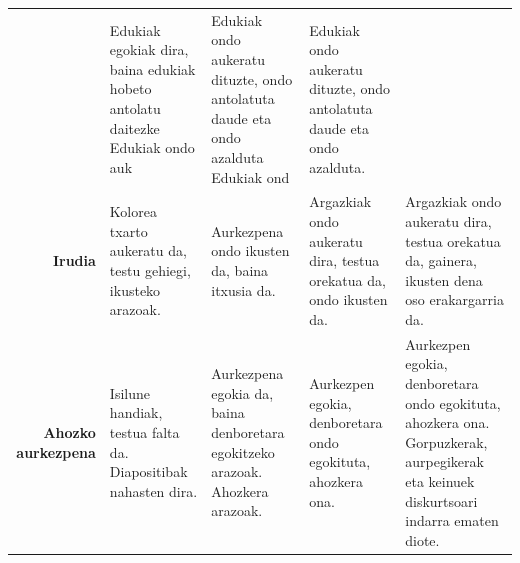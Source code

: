 \documentclass[
]{book}
\begin{document}
\begin{longtable}[]{@{}rllll@{}}
\begin{minipage}[t]{0.19\columnwidth}
\end{minipage} & \begin{minipage}[t]{0.19\columnwidth}\raggedright
Edukiak egokiak dira, baina edukiak hobeto antolatu daitezke \textbar{} Edukiak ondo auk\strut
\end{minipage} & \begin{minipage}[t]{0.19\columnwidth}\raggedright
Edukiak ondo aukeratu dituzte, ondo antolatuta daude eta ondo azalduta \textbar{} Edukiak ond\strut
\end{minipage} & \begin{minipage}[t]{0.19\columnwidth}\raggedright
Edukiak ondo aukeratu dituzte, ondo antolatuta daude eta ondo azalduta. \textbar{}\strut
\end{minipage}\tabularnewline
\begin{minipage}[t]{0.11\columnwidth}\raggedleft
\textbf{Irudia}\strut
\end{minipage} & \begin{minipage}[t]{0.19\columnwidth}\raggedright
Kolorea txarto aukeratu da, testu gehiegi, ikusteko arazoak.\strut
\end{minipage} & \begin{minipage}[t]{0.19\columnwidth}\raggedright
Aurkezpena ondo ikusten da, baina itxusia da.\strut
\end{minipage} & \begin{minipage}[t]{0.19\columnwidth}\raggedright
Argazkiak ondo aukeratu dira, testua orekatua da, ondo ikusten da.\strut
\end{minipage} & \begin{minipage}[t]{0.19\columnwidth}\raggedright
Argazkiak ondo aukeratu dira, testua orekatua da, gainera, ikusten dena oso erakargarria da. \textbar{}\strut
\end{minipage}\tabularnewline
\begin{minipage}[t]{0.11\columnwidth}\raggedleft
\textbf{Ahozko aurkezpena}\strut
\end{minipage} & \begin{minipage}[t]{0.19\columnwidth}\raggedright
Isilune handiak, testua falta da. Diapositibak nahasten dira.\strut
\end{minipage} & \begin{minipage}[t]{0.19\columnwidth}\raggedright
Aurkezpena egokia da, baina denboretara egokitzeko arazoak. Ahozkera arazoak.\strut
\end{minipage} & \begin{minipage}[t]{0.19\columnwidth}\raggedright
Aurkezpen egokia, denboretara ondo egokituta, ahozkera ona.\strut
\end{minipage} & \begin{minipage}[t]{0.19\columnwidth}\raggedright
Aurkezpen egokia, denboretara ondo egokituta, ahozkera ona. Gorpuzkerak, aurpegikerak eta keinuek diskurtsoari indarra ematen diote. \textbar{}\strut
\end{minipage}\tabularnewline
\bottomrule
\end{longtable}
\end{document}
